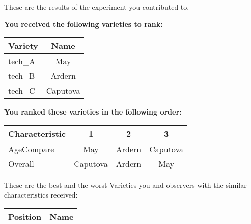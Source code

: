 \documentclass[10pt]{article}
\begin{document}
\begin{titlepage}
	These are the results of the experiment you contributed to.

	\begin{flushleft}
		\textbf{You received the following varieties to rank: }\hfill \break
		\begin{tabularx}{\textwidth}{ X | c  }
			\hline
			\textbf{Variety} & \textbf{Name} \\ \hline

			
				tech\_A & May \\ \hline
			
				tech\_B & Ardern \\ \hline
			
				tech\_C & Caputova \\ \hline
			


		\end{tabularx}\newline \newline

		\textbf{You ranked these varieties in the following order: }\hfill \break
		\begin{tabularx}{\textwidth}{ X | c | c | c  }
			\hline
			\textbf{Characteristic}
			
				& \textbf{ 1 }
			
				& \textbf{ 2 }
			
				& \textbf{ 3 }
			
			\\ \hline


			
				AgeCompare & May  & Ardern  & Caputova  \\ \hline


			
				Overall & Caputova  & Ardern  & May  \\ \hline


			

		\end{tabularx}

	\end{flushleft}

	\pagebreak

	\begin{flushleft}
		These are the best and the worst Varieties you and observers with the similar characteristics received:\hfill \break \newline
		\begin{tabularx}{\textwidth}{ X | X  }
			\hline
			\textbf{Position} & \textbf{Name} \\ \hline


\end{tabularx}
\end{flushleft}
\end{titlepage}
\end{document}
